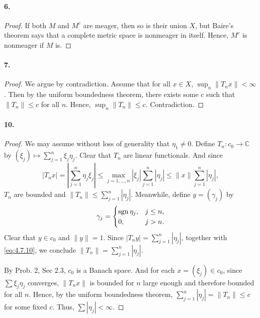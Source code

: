   \paragraph{6.}
  \begin{proof}
    If both $M$ and $M^c$ are meager, then so is their union $X$, but Baire's
    theorem says that a complete metric space is nonmeager in itself. Hence, 
    $M^c$ is nonmeager if $M$ is.
  \end{proof}
  
  \paragraph{7.}
  \begin{proof}
    We argue by contradiction. Assume that for all $x\in X$, $\sup_n\|T_nx\|<
    \infty$. Then by the uniform boundedness theorem, there exists some $c$
    such that $\|T_n\|\le c$ for all $n$. Hence, $\sup_n\|T_n\|\le c$. 
    Contradiction.
  \end{proof}
  
  \paragraph{10.}
  \begin{proof}
    We may assume without loss of generality that $\eta_1\ne 0$. Define $T_n:
    c_0\to\mathbb{C}$ by $(\xi_j)\mapsto \sum_{j=1}^n\xi_j\eta_j$. Clear that
    $T_n$ are linear functionals. And since
    \begin{equation}
      \label{eq:4.7.10}
      |T_nx|=\left|\sum_{j=1}^n\eta_j\xi_j\right|\le
      \max_{j=1,\dots,n}|\xi_j|\sum_{j=1}^n|\eta_j|\le
      \|x\|\sum_{j=1}^n|\eta_j|,
    \end{equation}
    $T_n$ are bounded and $\|T_n\|\le\sum_{j=1}^n|\eta_j|$. Meanwhile, define
    $y=(\gamma_j)$ by
    \[
      \gamma_j=\begin{cases}
        \operatorname{sgn}\eta_j, & j\le n, \\
        0         , & j>n.
      \end{cases}
    \]
    Clear that $y\in c_0$ and $\|y\|=1$. Since $|T_ny|=\sum_{j=1}^n|\eta_j|$,
    together with \eqref{eq:4.7.10}, we conclude $\|T_n\|=\sum_{j=1}^n|\eta_j|$.
    \par
    By Prob. 2, Sec 2.3, $c_0$ is a Banach space. And for each $x=(\xi_j)\in 
    c_0$, since $\sum\xi_j\eta_j$ converges, $\|T_nx\|$ is bounded for $n$ large 
    enough and therefore bounded for all $n$. Hence, by the uniform boundedness
    theorem, $\sum_{j=1}^n|\eta_j|=\|T_n\|\le c$ for some fixed $c$. Thus, $\sum
    |\eta_j|<\infty$.
  \end{proof}
  
